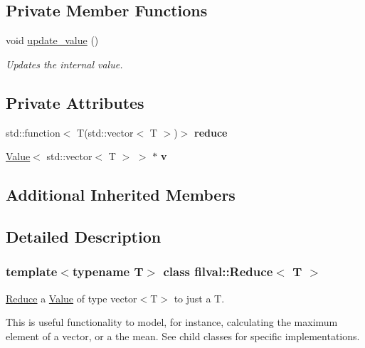 \subsection*{Private Member Functions}
\begin{DoxyCompactItemize}
\item 
void \hyperlink{classfilval_1_1Reduce_a7f6bc3bed99c9d41e045f675895d8f67}{update\+\_\+value} ()
\begin{DoxyCompactList}\small\item\em Updates the internal value. \end{DoxyCompactList}\end{DoxyCompactItemize}
\subsection*{Private Attributes}
\begin{DoxyCompactItemize}
\item 
\hypertarget{classfilval_1_1Reduce_a0bcdfd0837598bcf16547da181d3d8a2}{}\label{classfilval_1_1Reduce_a0bcdfd0837598bcf16547da181d3d8a2} 
std\+::function$<$ T(std\+::vector$<$ T $>$)$>$ {\bfseries reduce}
\item 
\hypertarget{classfilval_1_1Reduce_aa262aa756388d84b37bc2cf47022b515}{}\label{classfilval_1_1Reduce_aa262aa756388d84b37bc2cf47022b515} 
\hyperlink{classfilval_1_1Value}{Value}$<$ std\+::vector$<$ T $>$ $>$ $\ast$ {\bfseries v}
\end{DoxyCompactItemize}
\subsection*{Additional Inherited Members}


\subsection{Detailed Description}
\subsubsection*{template$<$typename T$>$\newline
class filval\+::\+Reduce$<$ T $>$}

\hyperlink{classfilval_1_1Reduce}{Reduce} a \hyperlink{classfilval_1_1Value}{Value} of type vector$<$\+T$>$ to just a T. 

This is useful functionality to model, for instance, calculating the maximum element of a vector, or a the mean. See child classes for specific implementations. 

